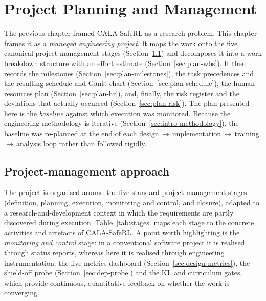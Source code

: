 
\chapter{Project Planning and Management}\label{ch:planning}

The previous chapter framed CALA-SafeRL as a research problem. This chapter frames it as a
\emph{managed engineering project}. It maps the work onto the five canonical project-management
stages (Section~\ref{sec:plan-approach}) and decomposes it into a work breakdown structure with an
effort estimate (Section~\ref{sec:plan-wbs}). It then records the milestones
(Section~\ref{sec:plan-milestones}), the task precedences and the resulting schedule and Gantt
chart (Section~\ref{sec:plan-schedule}), the human-resources plan
(Section~\ref{sec:plan-hr}), and, finally, the risk register and the deviations that actually
occurred (Section~\ref{sec:plan-risk}). The plan presented here is the \emph{baseline} against
which execution was monitored. Because the engineering methodology is iterative
(Section~\ref{sec:intro-methodology}), the baseline was re-planned at the end of each
design\,$\to$\,implementation\,$\to$\,training\,$\to$\,analysis loop rather than followed rigidly.

\section{Project-management approach}\label{sec:plan-approach}

The project is organised around the five standard project-management stages (definition,
planning, execution, monitoring and control, and closure), adapted to a research-and-development
context in which the requirements are partly discovered during execution.
Table~\ref{tab:stages} maps each stage to the concrete activities and artefacts of CALA-SafeRL.
A point worth highlighting is the \emph{monitoring and control} stage: in a conventional software
project it is realised through status reports, whereas here it is realised through engineering
instrumentation: the live metrics dashboard (Section~\ref{sec:design-metrics}), the
shield-off probe (Section~\ref{sec:dep-probe}) and the KL and curriculum gates, which provide
continuous, quantitative feedback on whether the work is converging.

